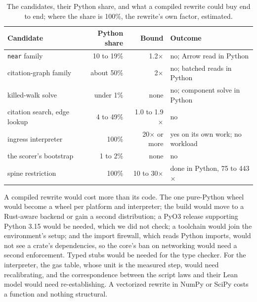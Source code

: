 \documentclass[11pt]{article}
\theoremstyle{plain}
\theoremstyle{definition}
\theoremstyle{remark}
\begin{document}
\begin{table}[ht]
\centering\small
\caption{The candidates, their Python share, and what a compiled rewrite could buy end to end;
where the share is 100\%, the rewrite's own factor, estimated.}\label{tab:verdict}
\begin{tabular}{@{}lrrl@{}}
\toprule
Candidate & Python share & Bound & Outcome \\
\midrule
\texttt{near} family & 10 to 19\% & 1.2$\times$ & no; Arrow read in Python \\
citation-graph family & about 50\% & 2$\times$ & no; batched reads in Python \\
killed-walk solve & under 1\% & none & no; component solve in Python \\
citation search, edge lookup & 4 to 49\% & 1.0 to 1.9$\times$ & no \\
ingress interpreter & 100\% & 20$\times$ or more & yes on its own work; no workload \\
the scorer's bootstrap & 1 to 2\% & none & no \\
spine restriction & 100\% & 10 to 30$\times$ & done in Python, 75 to 443$\times$ \\
\bottomrule
\end{tabular}
\end{table}

A compiled rewrite would cost more than its code. The one pure-Python wheel would become a wheel per
platform and interpreter; the build would move to a Rust-aware backend or gain a second
distribution; a PyO3 release supporting Python 3.15 would be needed, which we did not check; a
toolchain would join the environment's setup; and the import firewall, which reads Python imports,
would not see a crate's dependencies, so the core's ban on networking would need a second
enforcement. Typed stubs would be needed for the type checker. For the interpreter, the gas table,
whose unit is the measured step, would need recalibrating, and the correspondence between the
script laws and their Lean model would need re-establishing. A vectorized rewrite in NumPy or SciPy
costs a function and nothing structural.
\end{document}
